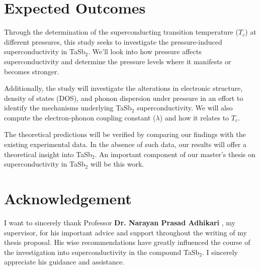 \documentclass[12pt,a4paper]{article}
\begin{document}
\newpage
\section{Expected Outcomes}





Through the determination of the superconducting transition temperature (\(T_c\)) at different pressures, this study seeks to investigate the pressure-induced superconductivity in TaSb$_2$. We'll look into how pressure affects superconductivity and determine the pressure levels where it manifests or becomes stronger.

Additionally, the study will investigate the alterations in electronic structure, density of states (DOS), and phonon dispersion under pressure in an effort to identify the mechanisms underlying TaSb$_2$ superconductivity. We will also compute the electron-phonon coupling constant (\( \lambda \)) and how it relates to \(T_c\).

The theoretical predictions will be verified by comparing our findings with the existing experimental data. In the absence of such data, our results will offer a theoretical insight into TaSb$_2$. An important component of our master's thesis on superconductivity in TaSb$_2$ will be this work.

\section*{Acknowledgement}

I want to sincerely thank Professor \textbf{Dr. Narayan Prasad Adhikari} , my supervisor, for his important advice and support throughout the writing of my thesis proposal.
His wise recommendations have greatly influenced the course of the investigation into superconductivity in the compound TaSb$_2$. I sincerely appreciate his guidance and assistance.


\vspace{0.5cm}


\vfill
\pagebreak
\end{document}
